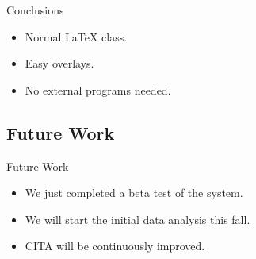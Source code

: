 \documentclass{beamer}
\begin{document}
\begin{frame}{Conclusions}
  \begin{itemize}
    \item Normal LaTeX class.
    \item Easy overlays.
    \item No external programs needed.      
  \end{itemize}
\end{frame}

\subsection{Future Work}

\begin{frame}{Future Work}
  \begin{itemize}
  \item We just completed a beta test of the system.
  \item We will start the initial data analysis this fall.
  \item CITA will be continuously improved.
\end{itemize}
\end{frame}
\end{document}
